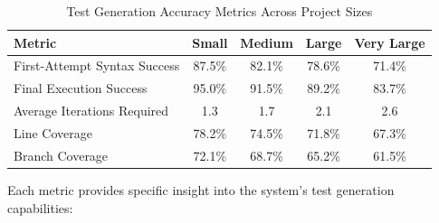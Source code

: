 \begin{table}[ht]
    \centering
    \caption{Test Generation Accuracy Metrics Across Project Sizes}
    \begin{tabular}{lcccc}
        \hline
        \textbf{Metric} & \textbf{Small} & \textbf{Medium} & \textbf{Large} & \textbf{Very Large} \\ \hline
        First-Attempt Syntax Success & 87.5\% & 82.1\% & 78.6\% & 71.4\% \\
        Final Execution Success & 95.0\% & 91.5\% & 89.2\% & 83.7\% \\
        Average Iterations Required & 1.3 & 1.7 & 2.1 & 2.6 \\
        Line Coverage & 78.2\% & 74.5\% & 71.8\% & 67.3\% \\
        Branch Coverage & 72.1\% & 68.7\% & 65.2\% & 61.5\% \\
        \hline
    \end{tabular}
\end{table}

Each metric provides specific insight into the system's test generation capabilities:

